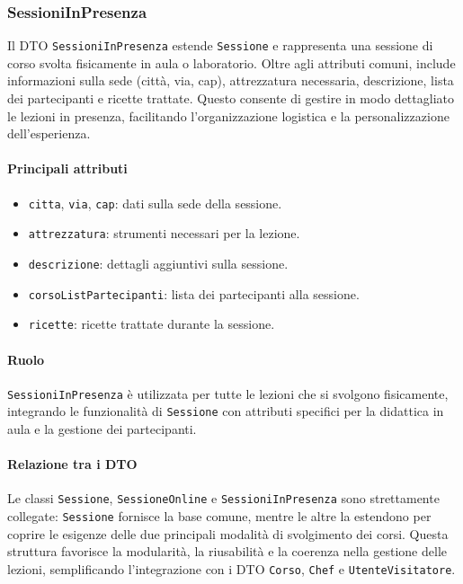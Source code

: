\subsubsection{SessioniInPresenza}
Il DTO \texttt{SessioniInPresenza} estende \texttt{Sessione} e rappresenta una sessione di corso svolta fisicamente in aula o laboratorio. Oltre agli attributi comuni, include informazioni sulla sede (città, via, cap), attrezzatura necessaria, descrizione, lista dei partecipanti e ricette trattate. Questo consente di gestire in modo dettagliato le lezioni in presenza, facilitando l'organizzazione logistica e la personalizzazione dell'esperienza.

\paragraph{Principali attributi}
\begin{itemize}
    \item \texttt{citta}, \texttt{via}, \texttt{cap}: dati sulla sede della sessione.
    \item \texttt{attrezzatura}: strumenti necessari per la lezione.
    \item \texttt{descrizione}: dettagli aggiuntivi sulla sessione.
    \item \texttt{corsoListPartecipanti}: lista dei partecipanti alla sessione.
    \item \texttt{ricette}: ricette trattate durante la sessione.
\end{itemize}

\paragraph{Ruolo}
\texttt{SessioniInPresenza} è utilizzata per tutte le lezioni che si svolgono fisicamente, integrando le funzionalità di \texttt{Sessione} con attributi specifici per la didattica in aula e la gestione dei partecipanti.

\paragraph{Relazione tra i DTO}
Le classi \texttt{Sessione}, \texttt{SessioneOnline} e \texttt{SessioniInPresenza} sono strettamente collegate: \texttt{Sessione} fornisce la base comune, mentre le altre la estendono per coprire le esigenze delle due principali modalità di svolgimento dei corsi. Questa struttura favorisce la modularità, la riusabilità e la coerenza nella gestione delle lezioni, semplificando l'integrazione con i DTO \texttt{Corso}, \texttt{Chef} e \texttt{UtenteVisitatore}.


